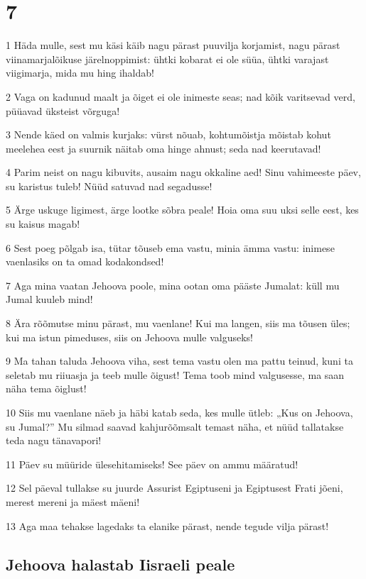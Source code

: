 \chapter{7}

\par 1 Häda mulle, sest mu käsi käib nagu pärast puuvilja korjamist, nagu pärast viinamarjalõikuse järelnoppimist: ühtki kobarat ei ole süüa, ühtki varajast viigimarja, mida mu hing ihaldab!
\par 2 Vaga on kadunud maalt ja õiget ei ole inimeste seas; nad kõik varitsevad verd, püüavad üksteist võrguga!
\par 3 Nende käed on valmis kurjaks: vürst nõuab, kohtumõistja mõistab kohut meelehea eest ja suurnik näitab oma hinge ahnust; seda nad keerutavad!
\par 4 Parim neist on nagu kibuvits, ausaim nagu okkaline aed! Sinu vahimeeste päev, su karistus tuleb! Nüüd satuvad nad segadusse!
\par 5 Ärge uskuge ligimest, ärge lootke sõbra peale! Hoia oma suu uksi selle eest, kes su kaisus magab!
\par 6 Sest poeg põlgab isa, tütar tõuseb ema vastu, minia ämma vastu: inimese vaenlasiks on ta omad kodakondsed!
\par 7 Aga mina vaatan Jehoova poole, mina ootan oma pääste Jumalat: küll mu Jumal kuuleb mind!
\par 8 Ära rõõmutse minu pärast, mu vaenlane! Kui ma langen, siis ma tõusen üles; kui ma istun pimeduses, siis on Jehoova mulle valguseks!
\par 9 Ma tahan taluda Jehoova viha, sest tema vastu olen ma pattu teinud, kuni ta seletab mu riiuasja ja teeb mulle õigust! Tema toob mind valgusesse, ma saan näha tema õiglust!
\par 10 Siis mu vaenlane näeb ja häbi katab seda, kes mulle ütleb: „Kus on Jehoova, su Jumal?” Mu silmad saavad kahjurõõmsalt temast näha, et nüüd tallatakse teda nagu tänavapori!
\par 11 Päev su müüride ülesehitamiseks! See päev on ammu määratud!
\par 12 Sel päeval tullakse su juurde Assurist Egiptuseni ja Egiptusest Frati jõeni, merest mereni ja mäest mäeni!
\par 13 Aga maa tehakse lagedaks ta elanike pärast, nende tegude vilja pärast!
\section*{Jehoova halastab Iisraeli peale}

